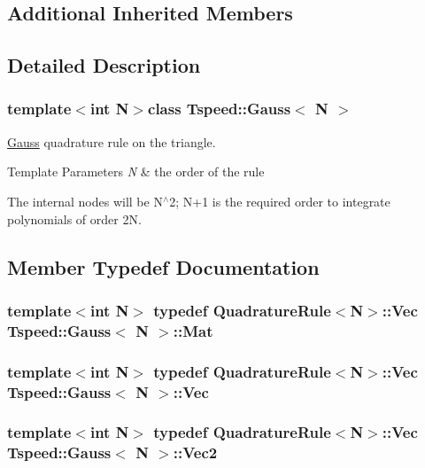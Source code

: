 \subsection*{Additional Inherited Members}


\subsection{Detailed Description}
\subsubsection*{template$<$int N$>$class Tspeed\-::\-Gauss$<$ N $>$}

\hyperlink{classTspeed_1_1Gauss}{Gauss} quadrature rule on the triangle. 


\begin{DoxyTemplParams}{Template Parameters}
{\em N} & the order of the rule\\
\hline
\end{DoxyTemplParams}
The internal nodes will be N$^\wedge$2; N+1 is the required order to integrate polynomials of order 2\-N. 

\subsection{Member Typedef Documentation}
\hypertarget{classTspeed_1_1Gauss_a60a04af13bc0e53cfae47226d1d3e6c2}{
\subsubsection[{Mat}]{\setlength{\rightskip}{0pt plus 5cm}template$<$int N$>$ typedef {\bf Quadrature\-Rule}$<$N$>$\-::{\bf Vec} {\bf Tspeed\-::\-Gauss}$<$ N $>$\-::{\bf Mat}}}\label{classTspeed_1_1Gauss_a60a04af13bc0e53cfae47226d1d3e6c2}
\hypertarget{classTspeed_1_1Gauss_aa7e6ce3b329db121166dc94669eeb64c}{
\subsubsection[{Vec}]{\setlength{\rightskip}{0pt plus 5cm}template$<$int N$>$ typedef {\bf Quadrature\-Rule}$<$N$>$\-::{\bf Vec} {\bf Tspeed\-::\-Gauss}$<$ N $>$\-::{\bf Vec}}}\label{classTspeed_1_1Gauss_aa7e6ce3b329db121166dc94669eeb64c}
\hypertarget{classTspeed_1_1Gauss_ae0f9176585d652260498c0b142b183eb}{
\subsubsection[{Vec2}]{\setlength{\rightskip}{0pt plus 5cm}template$<$int N$>$ typedef {\bf Quadrature\-Rule}$<$N$>$\-::{\bf Vec} {\bf Tspeed\-::\-Gauss}$<$ N $>$\-::{\bf Vec2}}}\label{classTspeed_1_1Gauss_ae0f9176585d652260498c0b142b183eb}


